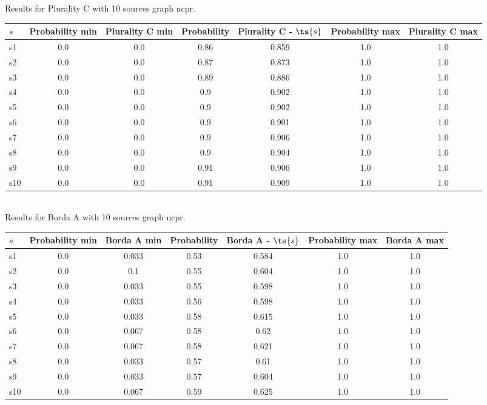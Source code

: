 \documentclass{article}
\begin{document}
\noindent Results for Plurality C with 10 sources graph ncpr.

\noindent\begin{tabular}{|l|c|c|c|c|c|c|}
\hline
$s$& Probability min & Plurality C min & Probability & Plurality C - $\ts{s}$ & Probability max & Plurality C max\\
\hline
s1 &0.0 & 0.0 & 0.86 & 0.859 & 1.0 & 1.0\\
\hline
s2 &0.0 & 0.0 & 0.87 & 0.873 & 1.0 & 1.0\\
\hline
s3 &0.0 & 0.0 & 0.89 & 0.886 & 1.0 & 1.0\\
\hline
s4 &0.0 & 0.0 & 0.9 & 0.902 & 1.0 & 1.0\\
\hline
s5 &0.0 & 0.0 & 0.9 & 0.902 & 1.0 & 1.0\\
\hline
s6 &0.0 & 0.0 & 0.9 & 0.901 & 1.0 & 1.0\\
\hline
s7 &0.0 & 0.0 & 0.9 & 0.906 & 1.0 & 1.0\\
\hline
s8 &0.0 & 0.0 & 0.9 & 0.904 & 1.0 & 1.0\\
\hline
s9 &0.0 & 0.0 & 0.91 & 0.906 & 1.0 & 1.0\\
\hline
s10 &0.0 & 0.0 & 0.91 & 0.909 & 1.0 & 1.0\\
\hline
\end{tabular}\\

\noindent Results for Borda A with 10 sources graph ncpr.

\noindent\begin{tabular}{|l|c|c|c|c|c|c|}
\hline
$s$& Probability min & Borda A min & Probability & Borda A - $\ts{s}$ & Probability max & Borda A max\\
\hline
s1 &0.0 & 0.033 & 0.53 & 0.584 & 1.0 & 1.0\\
\hline
s2 &0.0 & 0.1 & 0.55 & 0.604 & 1.0 & 1.0\\
\hline
s3 &0.0 & 0.033 & 0.55 & 0.598 & 1.0 & 1.0\\
\hline
s4 &0.0 & 0.033 & 0.56 & 0.598 & 1.0 & 1.0\\
\hline
s5 &0.0 & 0.033 & 0.58 & 0.615 & 1.0 & 1.0\\
\hline
s6 &0.0 & 0.067 & 0.58 & 0.62 & 1.0 & 1.0\\
\hline
s7 &0.0 & 0.067 & 0.58 & 0.621 & 1.0 & 1.0\\
\hline
s8 &0.0 & 0.033 & 0.57 & 0.61 & 1.0 & 1.0\\
\hline
s9 &0.0 & 0.033 & 0.57 & 0.604 & 1.0 & 1.0\\
\hline
s10 &0.0 & 0.067 & 0.59 & 0.625 & 1.0 & 1.0\\
\hline
\end{tabular}\\
\end{document}
